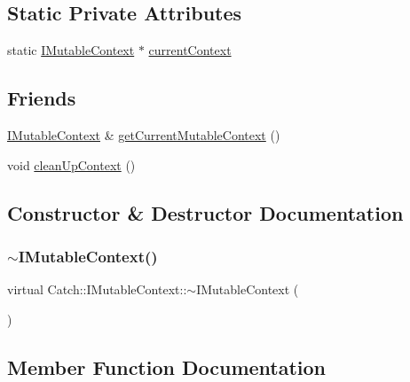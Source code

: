 \subsection*{Static Private Attributes}
\begin{DoxyCompactItemize}
\item 
static \mbox{\hyperlink{struct_catch_1_1_i_mutable_context}{I\+Mutable\+Context}} $\ast$ \mbox{\hyperlink{struct_catch_1_1_i_mutable_context_aca4de034d0deed74dba34f143e4e273e}{current\+Context}}
\end{DoxyCompactItemize}
\subsection*{Friends}
\begin{DoxyCompactItemize}
\item 
\mbox{\hyperlink{struct_catch_1_1_i_mutable_context}{I\+Mutable\+Context}} \& \mbox{\hyperlink{struct_catch_1_1_i_mutable_context_aea4b25692aaf4397cdf630716976f6b8}{get\+Current\+Mutable\+Context}} ()
\item 
void \mbox{\hyperlink{struct_catch_1_1_i_mutable_context_ac07cdb7d744cc8f09672d924324b55fd}{clean\+Up\+Context}} ()
\end{DoxyCompactItemize}


\subsection{Constructor \& Destructor Documentation}
\mbox{\label{struct_catch_1_1_i_mutable_context_a93f32b2ab6d0fb83637059240be799ab}} 
\subsubsection{\texorpdfstring{$\sim$IMutableContext()}{~IMutableContext()}}
{\footnotesize\ttfamily virtual Catch\+::\+I\+Mutable\+Context\+::$\sim$\+I\+Mutable\+Context (\begin{DoxyParamCaption}{ }\end{DoxyParamCaption})\hspace{0.3cm}{\ttfamily [virtual]}}



\subsection{Member Function Documentation}
\mbox{\label{struct_catch_1_1_i_mutable_context_a17e4b3f9a9674af7e2c4f081c692a628}} 

